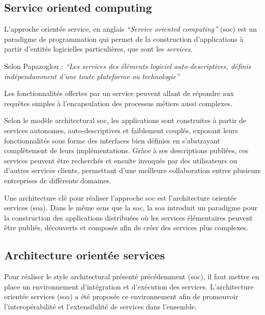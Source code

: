   \subsection{Service oriented computing}
  \label{sec:soc}
  L'approche orientée service, en anglais \textit{``Service oriented
    computing''} (\acrshort{soc}) est un paradigme de programmation
  qui permet de la construction d'applications à partir d'entités
  logicielles particulières, que sont les \emph{services}.\bigskip

  Selon Papazoglou \cite{papazoglou2003service}: \textit{``Les
    services des éléments logiciel auto-descriptives, définis
    indépendamment d'une toute plateforme ou technologie''}\bigskip

  Les fonctionnalités offertes par un service peuvent allant de
  répondre aux requêtes simples à l'encapsulation des processus
  métiers aussi complexes.\medskip

  Selon le modèle architectural \acrshort{soc}, les applications sont
  construites à partir de services autonomes, auto-descriptives et
  faiblement couplés, exposant leurs fonctionnalités sous forme des
  interfaces bien définies en s'abstrayant complètement de leurs
  implémentations. Grâce à ses descriptions publiées, ces services
  peuvent être recherchés et ensuite invoqués par des utilisateurs ou
  d'autres services clients, permettant d'une meilleure collaboration
  entres plusieurs entreprises de différents domaines.\medskip

  Une architecture clé pour réaliser l'approche \acrshort{soc} est
  l'architecture orientée services (\acrshort{soa}).  Dans le même
  sens que la \acrshort{soc}, la \acrshort{soa} introduit un paradigme
  pour la construction des applications distribuées où les services
  élémentaires peuvent être publiés, découverts et composés afin de
  créer des services plus complexes.

  \subsection{Architecture orientée services}
  \label{sec:soa}

  Pour réaliser le style architectural présenté précédemment
  (\acrshort{soc}), il faut mettre en place un environnement
  d'intégration et d'exécution des services. L'architecture orientée
  services (\acrshort{soa}) a été proposée ce environnement afin de
  promouvoir l'interopérabilité et l'extensibilité de services dans
  l'ensemble.\bigskip

